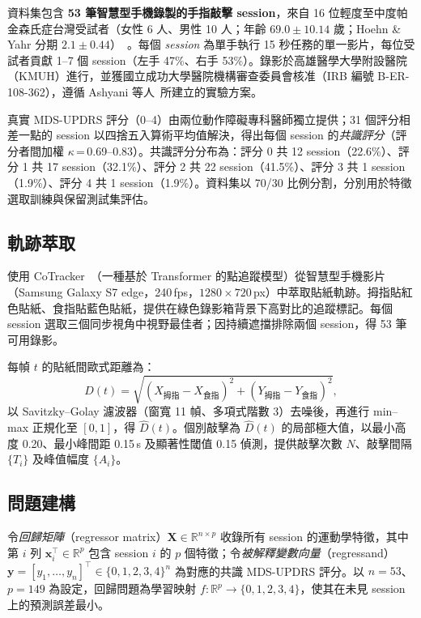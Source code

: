 \documentclass[12pt, a4paper]{article}
\begin{document}
資料集包含 \textbf{53 筆智慧型手機錄製的手指敲擊 session}，來自 16 位輕度至中度帕金森氏症台灣受試者（女性 6 人、男性 10 人；年齡 $69.0 \pm 10.14$ 歲；Hoehn \& Yahr 分期 $2.1 \pm 0.44$）~\cite{goetz2004movement}。每個 \emph{session} 為單手執行 15 秒任務的單一影片，每位受試者貢獻 1--7 個 session（左手 47\%、右手 53\%）。錄影於高雄醫學大學附設醫院（KMUH）進行，並獲國立成功大學醫院機構審查委員會核准（IRB 編號 B-ER-108-362），遵循 Ashyani 等人~\cite{ashyani2022digitization}所建立的實驗方案。

真實 MDS-UPDRS 評分（0--4）由兩位動作障礙專科醫師獨立提供；31 個評分相差一點的 session 以四捨五入算術平均值解決，得出每個 session 的\emph{共識評分}（評分者間加權 $\kappa$\,=\,0.69--0.83）。共識評分分布為：評分 0 共 12 session（22.6\%）、評分 1 共 17 session（32.1\%）、評分 2 共 22 session（41.5\%）、評分 3 共 1 session（1.9\%）、評分 4 共 1 session（1.9\%）。資料集以 70/30 比例分割，分別用於特徵選取訓練與保留測試集評估。

\subsection{軌跡萃取}

使用 CoTracker~\cite{karaev2023cotracker}（一種基於 Transformer 的點追蹤模型）從智慧型手機影片（Samsung Galaxy S7 edge，240\,fps，$1280 \times 720$\,px）中萃取貼紙軌跡。拇指貼紅色貼紙、食指貼藍色貼紙，提供在綠色錄影箱背景下高對比的追蹤標記。每個 session 選取三個同步視角中視野最佳者；因持續遮擋排除兩個 session，得 53 筆可用錄影。

每幀 $t$ 的貼紙間歐式距離為：
\begin{equation}
    D(t) = \sqrt{(X_{\text{拇指}} - X_{\text{食指}})^{2}
                 + (Y_{\text{拇指}} - Y_{\text{食指}})^{2}},
    \label{eq:distance}
\end{equation}
以 Savitzky--Golay 濾波器（窗寬 11 幀、多項式階數 3）去噪後，再進行 min--max 正規化至 $[0,1]$，得 $\hat{D}(t)$。個別敲擊為 $\hat{D}(t)$ 的局部極大值，以最小高度 0.20、最小峰間距 0.15\,s 及顯著性閾值 0.15 偵測，提供敲擊次數 $N$、敲擊間隔 $\{T_i\}$ 及峰值幅度 $\{A_i\}$。

\subsection{問題建構}

令\emph{回歸矩陣}（regressor matrix）$\mathbf{X} \in \mathbb{R}^{n \times p}$ 收錄所有
session 的運動學特徵，其中第 $i$ 列 $\mathbf{x}_i^{\top} \in \mathbb{R}^p$ 包含 session
$i$ 的 $p$ 個特徵；令\emph{被解釋變數向量}（regressand）
$\mathbf{y} = [y_1, \ldots, y_n]^{\top} \in \{0,1,2,3,4\}^n$ 為對應的共識 MDS-UPDRS
評分。以 $n = 53$、$p = 149$ 為設定，回歸問題為學習映射
$f: \mathbb{R}^p \to \{0,1,2,3,4\}$，使其在未見 session 上的預測誤差最小。
\end{document}
